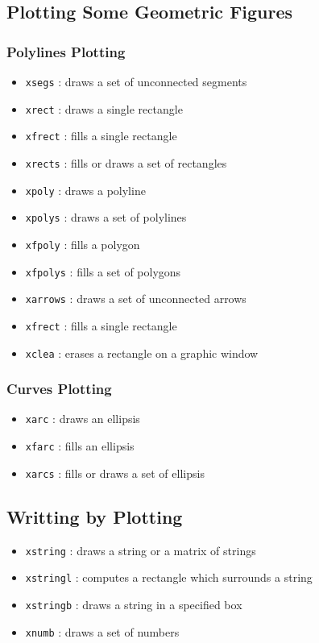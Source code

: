 \subsection{Plotting Some Geometric Figures}
\subsubsection{Polylines Plotting}
\begin{itemize}
	\item \verb+xsegs+	: draws	a set of unconnected segments 
	\item \verb+xrect+	: draws	a single rectangle
	\item \verb+xfrect+	: fills a single rectangle
	\item \verb+xrects+	: fills or draws a set	of rectangles
	\item \verb+xpoly+	: draws	a polyline
	\item \verb+xpolys+	: draws a set of polylines
	\item \verb+xfpoly+	: fills a polygon
	\item \verb+xfpolys+	: fills a set of polygons
	\item \verb+xarrows+	: draws a set of unconnected arrows
	\item \verb+xfrect+	: fills a single rectangle
	\item \verb+xclea+	: erases a rectangle on a graphic window
\end{itemize}
%

\subsubsection{Curves Plotting}
\begin{itemize}
	\item \verb+xarc+	: draws	an ellipsis
	\item \verb+xfarc+	: fills	an ellipsis
	\item \verb+xarcs+	: fills	or draws a set of ellipsis
\end{itemize}
%

\subsection{ Writting by Plotting}
%
\begin{itemize}
	\item  \verb+xstring+	: draws a string or a matrix of strings
        \item  \verb+xstringl+	: computes a rectangle which surrounds
        a string
	\item  \verb+xstringb+	: draws a string in a specified box
	\item  \verb+xnumb+	: draws a set of numbers
\end{itemize}
%

